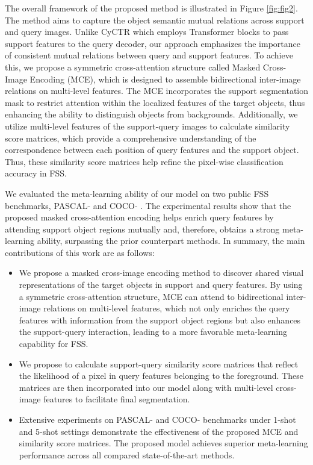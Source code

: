 \documentclass[conference]{IEEEtran}
\begin{document}
The overall framework of the proposed method is illustrated in Figure \ref{fig:fig2}. The method aims to capture the object semantic mutual relations across support and query images. Unlike CyCTR \cite{CyCTR} which employs Transformer blocks to pass support features to the query decoder, our approach emphasizes the importance of consistent mutual relations between query and support features. To achieve this, we propose a symmetric cross-attention structure called Masked Cross-Image Encoding (MCE), which is designed to assemble bidirectional inter-image relations on multi-level features. The MCE incorporates the support segmentation mask to restrict attention within the localized features of the target objects, thus enhancing the ability to distinguish objects from backgrounds. Additionally, we utilize multi-level features of the support-query images to calculate similarity score matrices, which provide a comprehensive understanding of the correspondence between each position of query features and the support object. Thus, these similarity score matrices help refine the pixel-wise classification accuracy in FSS.

We evaluated the meta-learning ability of our model on two public FSS benchmarks, PASCAL- \cite{VOC} and COCO- \cite{COCO}. The experimental results show that the proposed masked cross-attention encoding helps enrich query features by attending support object regions mutually and, therefore, obtains a strong meta-learning ability, surpassing the prior counterpart methods. In summary, the main contributions of this work are as follows:
\begin{itemize}
\item We propose a masked cross-image encoding method to discover shared visual representations of the target objects in support and query features. By using a symmetric cross-attention structure, MCE can attend to bidirectional inter-image relations on multi-level features, which not only enriches the query features with information from the support object regions but also enhances the support-query interaction, leading to a more favorable meta-learning capability for FSS.
\item We propose to calculate support-query similarity score matrices that reflect the likelihood of a pixel in query features belonging to the foreground. These matrices are then incorporated into our model along with multi-level cross-image features to facilitate final segmentation.
\item Extensive experiments on PASCAL- and COCO- benchmarks under 1-shot and 5-shot settings demonstrate the effectiveness of the proposed MCE and similarity score matrices. The proposed model achieves superior meta-learning performance across all compared state-of-the-art methods. 
\end{itemize}
\end{document}
